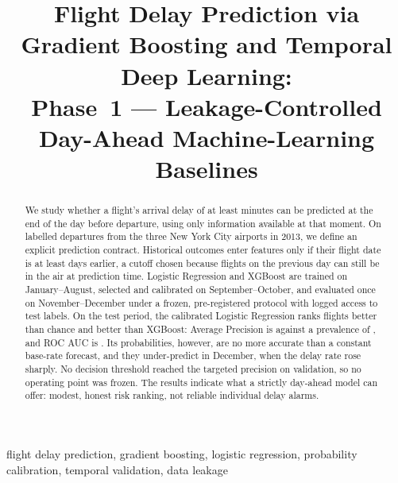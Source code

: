 \documentclass[conference]{IEEEtran}
\newcommand{\todo}[1]{\textcolor{red}{[TODO: #1]}}
\begin{document}
\title{Flight Delay Prediction via Gradient Boosting and Temporal Deep Learning:\\
Phase~1 --- Leakage-Controlled Day-Ahead Machine-Learning Baselines}

\author{\IEEEauthorblockN{\todo{Author name(s)}}
\IEEEauthorblockA{\todo{Department, institution}\\
\todo{City, country}\\
\todo{email}}}

\maketitle

\begin{abstract}
We study whether a flight's arrival delay of at least \TargetMinutes{} minutes can be predicted
at the end of the day before departure, using only information available at that moment. On
\DataLabelled{} labelled departures from the three New York City airports in 2013, we define an
explicit prediction contract. Historical outcomes enter features only if their flight date is at
least \HistLag{} days earlier, a cutoff chosen because flights on the previous day can still be in
the air at prediction time. Logistic Regression and XGBoost are trained on January--August,
selected and calibrated on September--October, and evaluated once on November--December under a
frozen, pre-registered protocol with logged access to test labels. On the test period, the
calibrated Logistic Regression ranks flights better than chance and better than XGBoost: Average
Precision is \TestAPLR{} against a prevalence of \TestPrev{}, and ROC AUC is \TestROCLR{}. Its
probabilities, however, are no more accurate than a constant base-rate forecast, and they
under-predict in December, when the delay rate rose sharply. No decision threshold reached the
targeted \MinPrecision{} precision on validation, so no operating point was frozen. The results
indicate what a strictly day-ahead model can offer: modest, honest risk ranking, not reliable
individual delay alarms.
\end{abstract}

\begin{IEEEkeywords}
flight delay prediction, gradient boosting, logistic regression, probability calibration,
temporal validation, data leakage
\end{IEEEkeywords}

\end{document}
